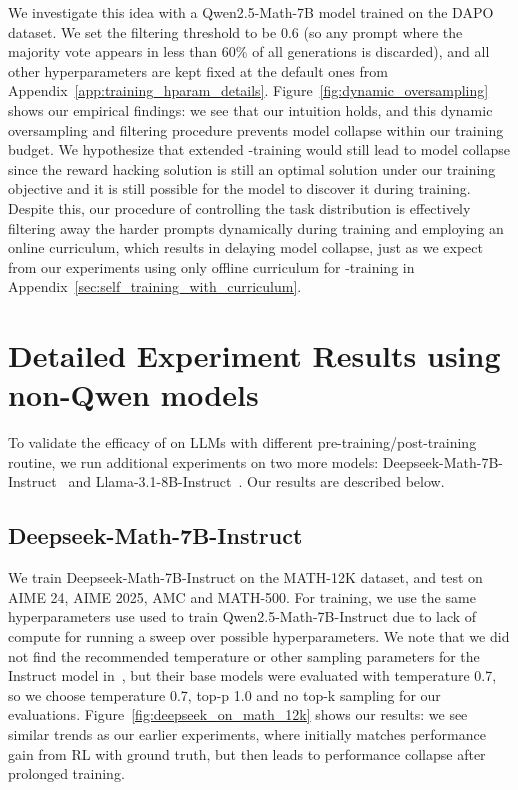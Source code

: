 We investigate this idea with a Qwen2.5-Math-7B model trained on the DAPO dataset. We set the filtering threshold to be $0.6$ (so any prompt where the majority vote appears in less than 60\% of all generations is discarded), and all other hyperparameters are kept fixed at the default ones from Appendix~\ref{app:training_hparam_details}. Figure~\ref{fig:dynamic_oversampling} shows our empirical findings: we see that our intuition holds, and this dynamic oversampling and filtering procedure prevents model collapse within our training budget. We hypothesize that extended \algo{}-training would still lead to model collapse since the reward hacking solution is still an optimal solution under our training objective and it is still possible for the model to discover it during training. Despite this, our procedure of controlling the task distribution is effectively filtering away the harder prompts dynamically during training and employing an online curriculum, which results in delaying model collapse, just as we expect from our experiments using only offline curriculum for \algo{}-training in Appendix~\ref{sec:self_training_with_curriculum}.

\newpage

\section{Detailed Experiment Results using non-Qwen models}

To validate the efficacy of \algo{} on LLMs with different pre-training/post-training routine, we run additional experiments on two more models: Deepseek-Math-7B-Instruct~\citep{shao2024deepseekmathpushinglimitsmathematical} and Llama-3.1-8B-Instruct~\citep{grattafiori2024llama3herdmodels}. Our results are described below.

\subsection{Deepseek-Math-7B-Instruct}

We train Deepseek-Math-7B-Instruct on the MATH-12K dataset, and test on AIME 24, AIME 2025, AMC and MATH-500. For training, we use the same hyperparameters use used to train Qwen2.5-Math-7B-Instruct due to lack of compute for running a sweep over possible hyperparameters. We note that we did not find the recommended temperature or other sampling parameters for the Instruct model in~\citep{shao2024deepseekmathpushinglimitsmathematical}, but their base models were evaluated with temperature 0.7, so we choose temperature 0.7, top-p 1.0 and no top-k sampling for our evaluations. Figure~\ref{fig:deepseek_on_math_12k} shows our results: we see similar trends as our earlier experiments, where \algo{} initially matches performance gain from RL with ground truth, but then leads to performance collapse after prolonged training. 

